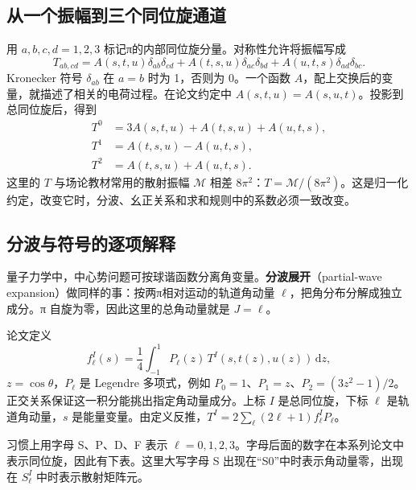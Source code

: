 \documentclass[UTF8,a4paper,11pt,fontset=fandol]{ctexart}
\numberwithin{equation}{section}
\newcommand{\dd}{\,\mathrm d}
\begin{document}
\subsection{从一个振幅到三个同位旋通道}
用 \(a,b,c,d=1,2,3\) 标记π的内部同位旋分量。对称性允许将振幅写成
\begin{equation}\label{eq:isospinamp}
T_{ab,cd}=A(s,t,u)\delta_{ab}\delta_{cd}
+A(t,s,u)\delta_{ac}\delta_{bd}
+A(u,t,s)\delta_{ad}\delta_{bc}.
\end{equation}
Kronecker 符号 \(\delta_{ab}\) 在 \(a=b\) 时为 1，否则为 0。一个函数 \(A\)，配上交换后的变量，就描述了相关的电荷过程。在论文约定中 \(A(s,t,u)=A(s,u,t)\)。投影到总同位旋后，得到
\begin{align}
T^0&=3A(s,t,u)+A(t,s,u)+A(u,t,s),\\
T^1&=A(t,s,u)-A(u,t,s),\\
T^2&=A(t,s,u)+A(u,t,s).
\end{align}
这里的 \(T\) 与场论教材常用的散射振幅 \(\mathcal M\) 相差 \(8\pi^2\)：\(T=\mathcal M/(8\pi^2)\)。这是归一化约定，改变它时，分波、幺正关系和求和规则中的系数必须一致改变。

\subsection{分波与符号的逐项解释}
量子力学中，中心势问题可按球谐函数分离角变量。\textbf{分波展开}（partial-wave expansion）做同样的事：按两π相对运动的轨道角动量 \(\ell\)，把角分布分解成独立成分。π 自旋为零，因此这里的总角动量就是 \(J=\ell\)。

论文定义
\begin{equation}\label{eq:partialwave}
f_\ell^I(s)=\frac14\int_{-1}^{1}P_\ell(z)\,T^I(s,t(z),u(z))\dd z,
\end{equation}
\(z=\cos\theta\)，\(P_\ell\) 是 Legendre 多项式，例如 \(P_0=1\)、\(P_1=z\)、\(P_2=(3z^2-1)/2\)。正交关系保证这一积分能挑出指定角动量成分。上标 \(I\) 是总同位旋，下标 \(\ell\) 是轨道角动量，\(s\) 是能量变量。由定义反推，\(T^I=2\sum_\ell(2\ell+1)f_\ell^I P_\ell\)。

习惯上用字母 S、P、D、F 表示 \(\ell=0,1,2,3\)。字母后面的数字在本系列论文中表示同位旋，因此有下表。这里大写字母 S 出现在“S0”中时表示角动量零，出现在 \(S_\ell^I\) 中时表示散射矩阵元。
\end{document}
